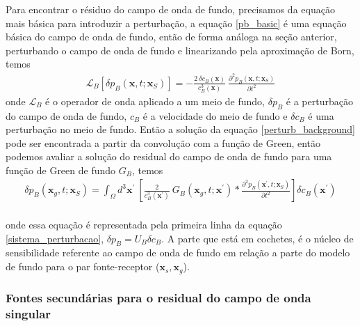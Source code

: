 Para encontrar o résiduo do campo de onda de fundo, precisamos da equação mais básica para introduzir a perturbação, a equação \ref{pb_basic} é uma equação básica do campo de onda de fundo, então de forma análoga na seção anterior, perturbando o campo de onda de fundo e linearizando pela aproximação de Born, temos \\
\begin{eqnarray}
\mathcal{L}_{B} \left [ \delta p_{B}(\mathbf{x},t;\mathbf{x}_{S}) \right ] = - \frac{2~\delta c_{B}(\mathbf{x})}{c^{3}_{B}(\mathbf{x})}~ \frac{\partial^{2} p_{B} (\mathbf{x},t;\mathbf{x}_{S})}{\partial t^{2}}
\label{perturb_background}
\end{eqnarray}
onde $\mathcal{L}_{B}$ é o operador de onda aplicado a um meio de fundo,  $\delta p_{B}$ é a perturbação do campo de onda de fundo, $c_{B}$ é a velocidade do meio de fundo e $\delta c_{B}$ é uma perturbação no meio de fundo. Então a solução da equação \ref{perturb_background} pode ser encontrada a partir da convolução com a função de Green, então podemos avaliar a solução do residual do campo de onda de fundo para uma função de Green de fundo $G_{B}$, temos \\
\begin{eqnarray}
 \delta p_{B} (\mathbf{x}_{g},t;\mathbf{x}_{S}) = \int_{\Omega} d^{3} \mathbf{x}^{\prime}~\left[\frac{2}{c^{3}_{B}(\mathbf{x}^{\prime})}~G_{B}(\mathbf{x}_{g},t; \mathbf{x}^{\prime}) * \frac{\partial^{2} p_{B}(\mathbf{x}^{\prime},t;\mathbf{x}_{S})}{\partial t^{2}} \right] \delta c_{B}(\mathbf{x}^{\prime})
\end{eqnarray}
\\
onde essa equação é representada pela primeira linha da equação \ref{sistema_perturbacao}, $\delta p_{B}={U}_{B} {\delta c}_{B}$. A parte que está em cochetes, é o núcleo de sensibilidade referente ao campo de onda de fundo em relação a parte do modelo de fundo para o par fonte-receptor ($\mathbf{x}_{s}, \mathbf{x}_{g}$). 

\subsubsection{Fontes secundárias para o residual do campo de onda singular}

